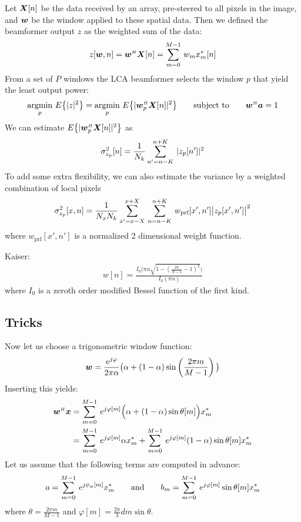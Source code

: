 Let $\boldsymbol{X}[n]$ be the data received by an array, pre-steered to all pixels in the image, and $\boldsymbol{w}$ be the window applied to these spatial data. Then we defined the beamformer output $z$ as the weighted sum of the data:
%
\begin{align}
z[\boldsymbol{w},n] = \boldsymbol{w}^{\scriptscriptstyle H}\boldsymbol{X}[n] = \sum\limits_{m=0}^{M-1}\, w_m x_m^*[n]
\end{align}
%
From a set of $P$ windows the LCA beamformer selects the window $p$ that yield the least output power:
%
\begin{align}
\underset{p}{\text{argmin}}\ {E\big\{|z|^2\big\}} = \underset{p}{\text{argmin}}\ {E\big\{|\boldsymbol{w}_p^{\scriptscriptstyle H}\boldsymbol{X}[n]|^2\big\}} \qquad\text{subject to}\qquad \boldsymbol{w}^{\scriptscriptstyle H}\boldsymbol{a} = 1
\end{align}
%
We can estimate $E\big\{|\boldsymbol{w}_p^{\scriptscriptstyle H}\boldsymbol{X}[n]|^2\big\}$ as
%
\begin{align*}
\sigma^2_{z_p}[n] = \frac{1}{N_k} \sum\limits_{n'=n-K}^{n+K}\, | z_p[n'] |^2
\end{align*}
%
To add some extra flexibility, we can also estimate the variance by a weighted combination of local pixels
%
\begin{align*}
\sigma^2_{z_p}[x,n] = \frac{1}{N_x N_k} \sum\limits_{x'=x-X}^{x+X}\, \sum\limits_{n=n-K}^{n+K}\, w_\text{prf}[x',n']\big| z_p[x',n'] \big|^2
\end{align*}
%
where $w_\text{prf}[x',n']$ is a normalized 2 dimensional weight function. 

Kaiser:
%
\begin{align*}
w[n] = \frac{I_0\big( \pi\alpha\sqrt{1-(\frac{2n}{N-1}-1)^2}\big)}{I_0(\pi\alpha)}
\end{align*}
%
where $I_0$ is a zeroth order modified Bessel function of the first kind.


\subsection{Tricks}

Now let us choose a trigonometric window function:
%
\begin{align}
\boldsymbol{w} = \frac{e^{j\varphi}}{2\pi\alpha}\big(\alpha + (1-\alpha)\sin\left(\frac{2\pi m}{M-1}\right)\big)
\end{align}
%
Inserting this yields:
%
\begin{align}
\boldsymbol{w}^{\scriptscriptstyle H}\boldsymbol{x} &= \sum\limits_{m=0}^{M-1}\, e^{j\varphi[m]}\Big(\alpha + (1-\alpha)\sin\theta[m]\Big) x_m^* \nonumber\\
&= \sum\limits_{m=0}^{M-1}\, e^{j\varphi[m]}\alpha x_m^* + \sum\limits_{m=0}^{M-1}\, e^{j\varphi[m]}(1-\alpha)\sin\theta[m] x_m^*
\end{align}
%
Let us assume that the following terms are computed in advance:
%
\begin{align}
a = \sum\limits_{m=0}^{M-1}\, e^{j\phi_\varphi[m]}x_m^* \qquad \text{and} \qquad b_m = \sum\limits_{m=0}^{M-1}\, e^{j\varphi[m]}\sin\theta[m]x_m^*
\end{align}
%
where $\theta = \frac{2\pi m}{M-1}$ and $\varphi[m] = \frac{2\pi}{\lambda}dm\sin\theta$.

